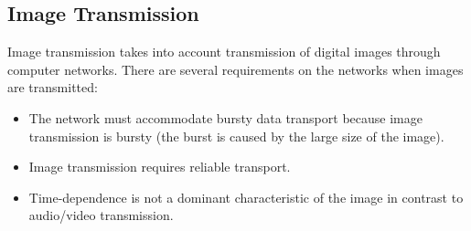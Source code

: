 %
%
%	
%	

\subsection{Image Transmission}
Image transmission takes into account transmission of digital images through computer networks. There are several requirements on the networks when images are transmitted:
\begin{itemize}
	\item The network must accommodate bursty data transport because image transmission is bursty (the burst is caused by the large size of the image).
	\item Image transmission requires reliable transport.
	\item Time-dependence is not a dominant characteristic of the image in contrast to audio/video transmission.
\end{itemize}


